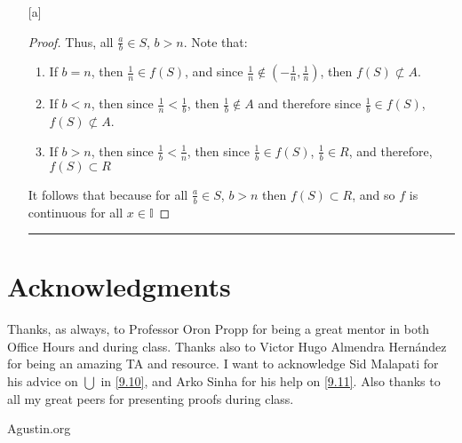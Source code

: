 \documentclass[openany, amssymb, psamsfonts]{amsart}
\newcommand{\bbI}{\mathbb{I}}
\theoremstyle{definition}
\numberwithin{equation}{section}
\begin{document}
\begin{enumerate} [a]
\begin{proof}
Thus, all $\frac{a}{b} \in S$, $b>n$. Note that:
\begin{enumerate}
    \item If $b= n$, then $\frac{1}{n}\in f(S)$, and since $\frac{1}{n}\notin (-\frac{1}{n},\frac{1}{n})$, then $f(S) \not\subset A$.
    \item If $b<n$, then since $\frac{1}{n}<\frac{1}{b}$, then $\frac{1}{b}\notin A$ and therefore since $\frac{1}{b} \in f(S)$, $f(S)\not\subset A$. 
    \item If $b>n$, then since $\frac{1}{b}<\frac{1}{n}$, then since $\frac{1}{b} \in f(S)$, $\frac{1}{b} \in R$, and therefore, $f(S) \subset R$ 
\end{enumerate}
It follows that because for all $\frac{a}{b}\in S$, $b>n$ then $f(S) \subset R$, and so $f$ is continuous for all $x\in \bbI$
\end{proof}\vspace{4pt}     \hrule   \vspace{4pt}
\end{enumerate}


\section*{Acknowledgments} 
Thanks, as always, to Professor Oron Propp for being a great mentor in both Office Hours and during class. Thanks also to Victor Hugo Almendra Hernández for being an amazing TA and resource. I want to acknowledge Sid Malapati for his advice on $\bigcup$ in \ref{9.10}, and Arko Sinha for his help on \ref{9.11}. Also thanks to all my great peers for presenting proofs during class.
\begin{thebibliography}{9}

 Agustin.org


\end{thebibliography}
\end{document}
